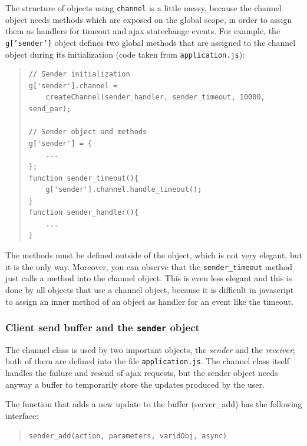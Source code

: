 \documentclass[10pt,a4paper,english]{book}
\begin{document}
The structure of objects using \texttt{channel} is a little messy, because
the channel object needs methods which are exposed on the global
scope, in order to assign them as handlers for timeout and ajax
statechange events. For example, the \texttt{g{[}'sender'{]}} object defines
two global methods that are assigned to the channel object during its
initialization (code taken from \texttt{application.js}):
\begin{quote}\begin{verbatim}
// Sender initialization
g['sender'].channel =
    createChannel(sender_handler, sender_timeout, 10000, send_par);

// Sender object and methods
g['sender'] = {
    ...
};
function sender_timeout(){
    g['sender'].channel.handle_timeout();
}
function sender_handler(){
    ...
}
\end{verbatim}
\end{quote}

The methods must be defined outside of the object, which is not very
elegant, but it is the only way. Moreover, you can observe that the
\texttt{sender{\_}timeout} method just calls a method into the channel
object. This is even less elegant and this is done by all objects that
use a channel object, because it is difficult in javascript to assign
an inner method of an object as handler for an event like the timeout.



\hypertarget{client-send-buffer-and-the-sender-object}{}
\subsubsection{Client send buffer and the \texttt{sender} object}
\label{client-send-buffer-and-the-sender-object}

The channel class is used by two important objects, the \emph{sender} and
the \emph{receiver}; both of them are defined into the file
\texttt{application.js}. The channel class itself handles the failure and
resend of ajax requests, but the sender object needs anyway a buffer
to temporarily store the updates produced by the user.

The function that adds a new update to the buffer (server{\_}add) has the
following interface:
\begin{quote}\begin{verbatim}
sender_add(action, parameters, varidObj, async)
\end{verbatim}
\end{quote}
\end{document}

